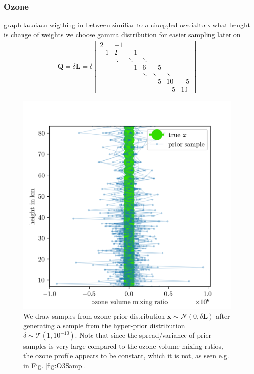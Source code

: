 \subsubsection{Ozone}
graph lacoiacn 
wigthing in between
similiar to a ciuop;led osscialtors
what heught is change of weights
we choose gamma distribution for easier sampling later on 
\begin{align}
	\bm{Q}= \delta \bm{L} =
	\delta
	\begin{bmatrix}
		2 & -1 & & &  \\
		-1 & 2 & -1 & &   \\
		& \ddots & \ddots & \ddots &\\ 
		&   & -1 & 6 & -5 \\
		& & & \ddots & \ddots & \ddots  \\ 
		& & & &  -5 & 10 & -5 \\
		& & & & & -5 & 10 
	\end{bmatrix} 
\label{eq:GLapl} 
\end{align}
\begin{figure}[ht!]
	\centering
	\includegraphics{OzonePrior.png}
	\caption[Samples from ozone prior distribution.]{We draw samples from ozone prior distribution $\bm{x} \sim \mathcal{N}(0,\delta \bm{L})$ after generating a sample from the hyper-prior distribution $\delta \sim \mathcal{T}(1,10^{-10})$. Note that since the spread/variance of prior samples is very large compared to the ozone volume mixing ratios, the ozone profile appears to be constant, which it is not, as seen e.g. in Fig. \ref{fig:O3Samp}.}
	\label{fig:O3Prior}
\end{figure}
